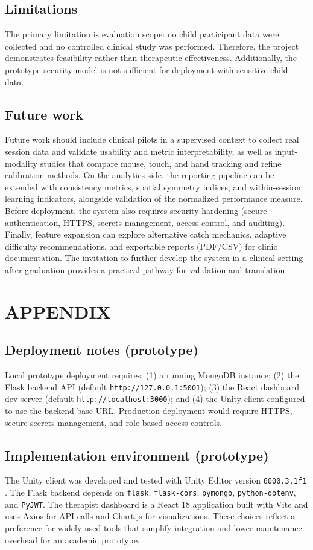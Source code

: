 \documentclass[12pt]{article}
\begin{document}
\subsection*{Limitations}
The primary limitation is evaluation scope: no child participant data were collected and no controlled clinical study was performed. Therefore, the project demonstrates feasibility rather than therapeutic effectiveness. Additionally, the prototype security model is not sufficient for deployment with sensitive child data.

\subsection*{Future work}
Future work should include clinical pilots in a supervised context to collect real session data and validate usability and metric interpretability, as well as input-modality studies that compare mouse, touch, and hand tracking and refine calibration methods. On the analytics side, the reporting pipeline can be extended with consistency metrics, spatial symmetry indices, and within-session learning indicators, alongside validation of the normalized performance measure. Before deployment, the system also requires security hardening (secure authentication, HTTPS, secrets management, access control, and auditing). Finally, feature expansion can explore alternative catch mechanics, adaptive difficulty recommendations, and exportable reports (PDF/CSV) for clinic documentation.
The invitation to further develop the system in a clinical setting after graduation provides a practical pathway for validation and translation.

\clearpage
\section{APPENDIX}
\subsection*{Deployment notes (prototype)}
Local prototype deployment requires: (1) a running MongoDB instance; (2) the Flask backend API (default \texttt{http://127.0.0.1:5001}); (3) the React dashboard dev server (default \texttt{http://localhost:3000}); and (4) the Unity client configured to use the backend base URL. Production deployment would require HTTPS, secure secrets management, and role-based access controls.

\subsection*{Implementation environment (prototype)}
The Unity client was developed and tested with Unity Editor version \texttt{6000.3.1f1} \cite{ref14}. The Flask backend depends on \texttt{flask}, \texttt{flask-cors}, \texttt{pymongo}, \texttt{python-dotenv}, and \texttt{PyJWT}. The therapist dashboard is a React 18 application built with Vite and uses Axios for API calls and Chart.js for visualizations. These choices reflect a preference for widely used tools that simplify integration and lower maintenance overhead for an academic prototype.
\end{document}
